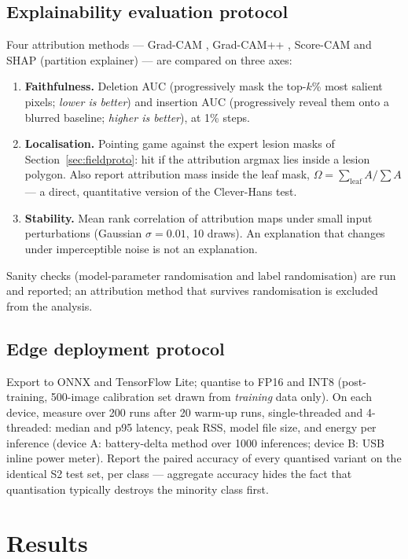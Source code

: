 \documentclass[10pt,twocolumn,a4paper]{article}
\begin{document}
\subsection{Explainability evaluation protocol}
\label{sec:xai}
Four attribution methods --- Grad-CAM \cite{gradcam2017}, Grad-CAM++ \cite{gradcampp2018}, Score-CAM and SHAP (partition explainer) --- are compared on three axes:
\begin{enumerate}[leftmargin=1.3em,itemsep=1pt,topsep=2pt]
\item \textbf{Faithfulness.} Deletion AUC (progressively mask the top-$k$\% most salient pixels; \emph{lower is better}) and insertion AUC (progressively reveal them onto a blurred baseline; \emph{higher is better}), at 1\% steps.
\item \textbf{Localisation.} Pointing game against the expert lesion masks of Section~\ref{sec:fieldproto}: hit if the attribution argmax lies inside a lesion polygon. Also report attribution mass inside the leaf mask, $\Omega=\sum_{\text{leaf}}A / \sum A$ --- a direct, quantitative version of the Clever-Hans test.
\item \textbf{Stability.} Mean rank correlation of attribution maps under small input perturbations (Gaussian $\sigma=0.01$, 10 draws). An explanation that changes under imperceptible noise is not an explanation.
\end{enumerate}
Sanity checks (model-parameter randomisation and label randomisation) are run and reported; an attribution method that survives randomisation is excluded from the analysis.

\subsection{Edge deployment protocol}
\label{sec:edge}
Export to ONNX and TensorFlow Lite; quantise to FP16 and INT8 (post-training, 500-image calibration set drawn from \emph{training} data only). On each device, measure over 200 runs after 20 warm-up runs, single-threaded and 4-threaded: median and p95 latency, peak RSS, model file size, and energy per inference (device A: battery-delta method over 1000 inferences; device B: USB inline power meter). Report the paired accuracy of every quantised variant on the identical S2 test set, per class --- aggregate accuracy hides the fact that quantisation typically destroys the minority class first.

\section{Results}
\label{sec:results}
\end{document}
